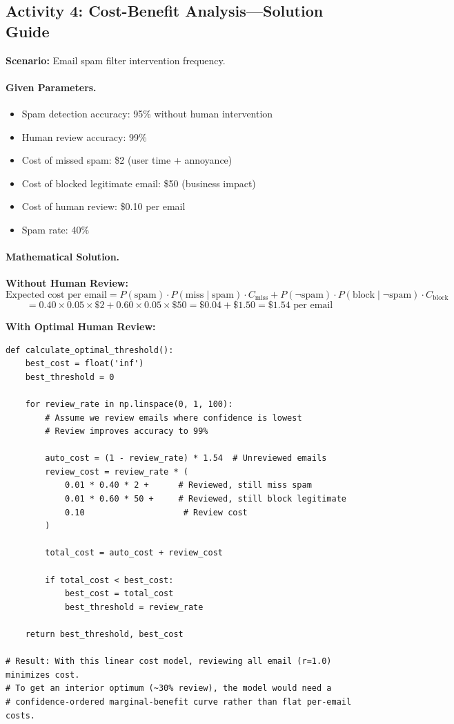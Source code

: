 \subsection{Activity 4: Cost-Benefit Analysis---Solution Guide}

\textbf{Scenario:} Email spam filter intervention frequency.

\paragraph{Given Parameters.}
\begin{itemize}
    \item Spam detection accuracy: 95\% without human intervention
    \item Human review accuracy: 99\%
    \item Cost of missed spam: \$2 (user time + annoyance)
    \item Cost of blocked legitimate email: \$50 (business impact)
    \item Cost of human review: \$0.10 per email
    \item Spam rate: 40\%
\end{itemize}

\paragraph{Mathematical Solution.}

\textbf{Without Human Review:}
\[
\text{Expected cost per email}
= P(\text{spam}) \cdot P(\text{miss} \mid \text{spam}) \cdot C_{\text{miss}}
+ P(\lnot\text{spam}) \cdot P(\text{block} \mid \lnot\text{spam}) \cdot C_{\text{block}}
\]
\[
= 0.40 \times 0.05 \times \$2 + 0.60 \times 0.05 \times \$50
= \$0.04 + \$1.50 = \$1.54 \text{ per email}
\]

\textbf{With Optimal Human Review:}
\begin{lstlisting}[style=python, caption={Optimal spam filter threshold calculation}]
def calculate_optimal_threshold():
    best_cost = float('inf')
    best_threshold = 0

    for review_rate in np.linspace(0, 1, 100):
        # Assume we review emails where confidence is lowest
        # Review improves accuracy to 99%

        auto_cost = (1 - review_rate) * 1.54  # Unreviewed emails
        review_cost = review_rate * (
            0.01 * 0.40 * 2 +      # Reviewed, still miss spam
            0.01 * 0.60 * 50 +     # Reviewed, still block legitimate
            0.10                    # Review cost
        )

        total_cost = auto_cost + review_cost

        if total_cost < best_cost:
            best_cost = total_cost
            best_threshold = review_rate

    return best_threshold, best_cost

# Result: With this linear cost model, reviewing all email (r=1.0) minimizes cost.
# To get an interior optimum (~30% review), the model would need a
# confidence-ordered marginal-benefit curve rather than flat per-email costs.
\end{lstlisting}

